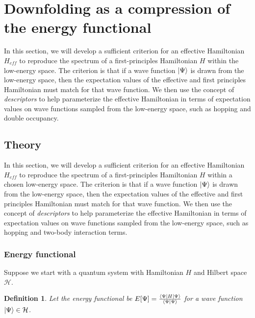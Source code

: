 \newtheorem{theorem}{Theorem}
\newtheorem{definition}{Definition}
\newtheorem{lemma}{Lemma}


\section{Downfolding as a compression of the energy functional}
\label{sec:theory}

In this section, we will develop a sufficient criterion for an effective Hamiltonian $H_{eff}$ to reproduce the spectrum of a first-principles Hamiltonian $H$ within the low-energy space. 
The criterion is that if a wave function $\ket{\Psi}$ is drawn from the low-energy space, then the expectation values of the effective and first principles Hamiltonian must match for that wave function.
We then use the concept of \textit{descriptors} to help parameterize the effective Hamiltonian in terms of expectation values on wave functions sampled from the low-energy space, such as hopping and double occupancy.

\subsection{Theory} 
In this section, we will develop a sufficient criterion for an effective Hamiltonian $H_{eff}$ to reproduce the spectrum of a first-principles Hamiltonian $H$ within a chosen low-energy space. 
The criterion is that if a wave function $\ket{\Psi}$ is drawn from the low-energy space, then the expectation values of the effective and first principles Hamiltonian must match for that wave function.
We then use the concept of \textit{descriptors} to help parameterize the effective Hamiltonian in terms of expectation values on wave functions sampled from the low-energy space, such as hopping and two-body interaction terms. 
\subsubsection{Energy functional}
Suppose we start with a quantum system with Hamiltonian $H$ and Hilbert space ${\mathcal H}$.

\begin{definition}
Let the energy functional be $E[\Psi] = \frac{\bra{\Psi}H\ket{\Psi}}{\braket{\Psi|\Psi}}$ for a wave function $\ket{\Psi} \in {\mathcal H}$.
\end{definition}


